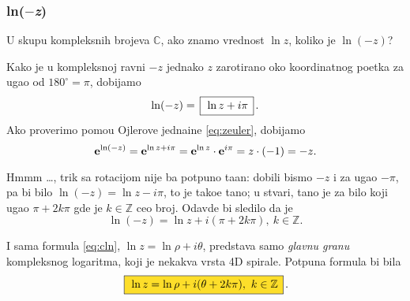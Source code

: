 \subsubsection{ln($-$\textit{z})}

\zadatak U skupu kompleksnih brojeva $\mathbb C$, ako znamo vrednost $\ln z$,
koliko je $\ln(-z)$?

\resenje Kako je u kompleksnoj ravni $-z$ jednako $z$ zarotirano 
oko koordi\-natnog po{\cv}etka
za ugao od $180^\circ=\pi$, dobijamo
$$
\ln (-z) = \ram{\ln z +i\pi}.
$$ 
Ako proverimo pomo{\cc}u Ojlerove jedna{\cv}ine \eqref{eq:zeuler}, dobijamo
$$
{\bf e}^{\ln(-z)} = {\bf e}^{\ln z+i\pi} = {\bf e}^{\ln z}\cdot {\bf e}^{i\pi}=z \cdot (-1)=-z.
$$

\dodatak Hmmm \dots, trik sa rotacijom nije ba{\sv} potpuno ta{\cv}an: dobili bismo $-z$ i za ugao $-\pi$,
pa bi bilo $\ln(-z)=\ln z-i\pi$, {\sv}to je tako{\dj}e ta{\cv}no;
u stvari, ta{\cv}no je za bilo koji ugao $\pi+2k\pi$ gde je $k\in{\mathbb Z}$ ceo broj. Odavde bi sledilo da je
$$
\ln(-z) = \ln z + i(\pi+2k\pi),\ k\in{\mathbb Z}.
$$

I sama formula \eqref{eq:cln}, $\ln z=\ln\rho + i\theta$, predstav{\lj}a samo {\sl glavnu granu\/}
kompleksnog logaritma, koji je nekakva vrsta 4D spirale. Potpuna formula bi bila
\begin{equation}
    \okvir{\ln z=\ln\rho + i(\theta + 2k\pi),\ k\in{\mathbb Z}} .
\end{equation}